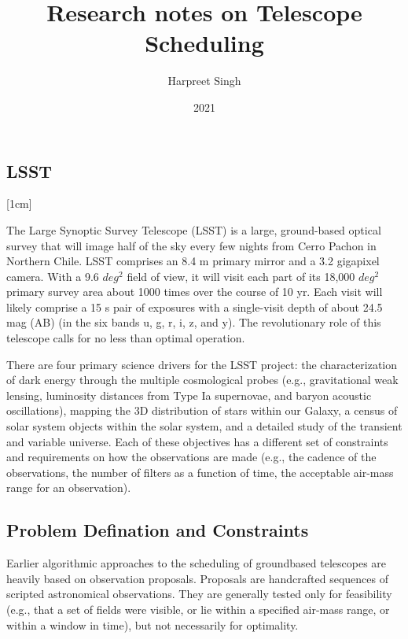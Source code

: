 \documentclass{article}
\title{Research notes on Telescope Scheduling}
\author{Harpreet Singh}
\date{2021}
\begin{document}
\begin{titlepage}
\maketitle
\end{titlepage}

\section*{}

\subsection*{LSST}
[1cm]

The Large Synoptic Survey Telescope (LSST) is a large,
ground-based optical survey that will image half of the sky
every few nights from Cerro Pachon in Northern Chile. LSST
comprises an 8.4 m primary mirror and a 3.2 gigapixel camera.
With a 9.6 \(deg^2\) field of view, it will visit each part of its
18,000 \(deg^2\) primary survey area about 1000 times over the
course of 10 yr. Each visit will likely comprise a 15 s pair of
exposures with a single-visit depth of about 24.5 mag (AB)
(in the six bands u, g, r, i, z, and y). The revolutionary role of
this telescope calls for no less than optimal operation.

There are four primary science drivers for the LSST project:
the characterization of dark energy through the multiple
cosmological probes (e.g., gravitational weak lensing, luminosity distances from Type Ia supernovae, and baryon acoustic
oscillations), mapping the 3D distribution of stars within our
Galaxy, a census of solar system objects within the solar
system, and a detailed study of the transient and variable
universe. Each of these objectives has a different set of
constraints and requirements on how the observations are made
(e.g., the cadence of the observations, the number of filters as a
function of time, the acceptable air-mass range for an
observation). 

\subsection*{Problem Defination and Constraints}


Earlier algorithmic approaches to the scheduling of groundbased telescopes 
are heavily based on observation proposals.
Proposals are handcrafted sequences of scripted astronomical
observations. They are generally tested only for feasibility
(e.g., that a set of fields were visible, or lie within a specified
air-mass range, or within a window in time), but not necessarily
for optimality.
\end{document}
